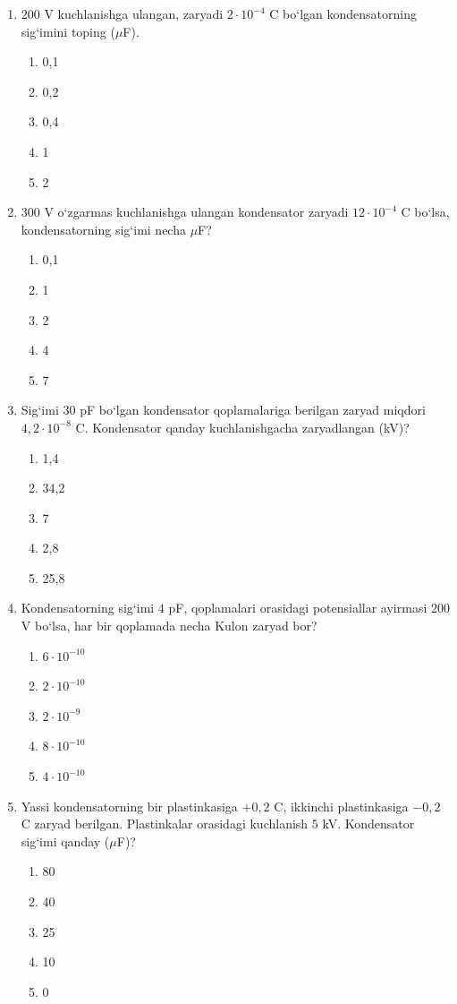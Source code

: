 \begin{enumerate}
\item $200$ V kuchlanishga ulangan, zaryadi $2\cdot10^{-4}$ C bo‘lgan kondensatorning sig‘imini toping ($\mu$F).
\begin{enumerate}[label=\Alph*)]
\item 0,1
\item 0,2
\item 0,4
\item 1
\item 2
\end{enumerate}

\item $300$ V o‘zgarmas kuchlanishga ulangan kondensator zaryadi $12\cdot10^{-4}$ C bo‘lsa, kondensatorning sig‘imi necha $\mu$F?
\begin{enumerate}[label=\Alph*)]
\item 0,1
\item 1
\item 2
\item 4
\item 7
\end{enumerate}

\item Sig‘imi $30$ pF bo‘lgan kondensator qoplamalariga berilgan zaryad miqdori $4,2\cdot10^{-8}$ C. Kondensator qanday kuchlanishgacha zaryadlangan (kV)?
\begin{enumerate}[label=\Alph*)]
\item 1,4
\item 34,2
\item 7
\item 2,8
\item 25,8
\end{enumerate}

\item Kondensatorning sig‘imi $4$ pF, qoplamalari orasidagi potensiallar ayirmasi $200$ V bo‘lsa, har bir qoplamada necha Kulon zaryad bor?
\begin{enumerate}[label=\Alph*)]
\item $6\cdot10^{-10}$
\item $2\cdot10^{-10}$
\item $2\cdot10^{-9}$
\item $8\cdot10^{-10}$
\item $4\cdot10^{-10}$
\end{enumerate}

\item Yassi kondensatorning bir plastinkasiga $+0,2$ C, ikkinchi plastinkasiga $-0,2$ C zaryad berilgan. Plastinkalar orasidagi kuchlanish $5$ kV. Kondensator sig‘imi qanday ($\mu$F)?
\begin{enumerate}[label=\Alph*)]
\item 80
\item 40
\item 25
\item 10
\item 0
\end{enumerate}


\end{enumerate}
